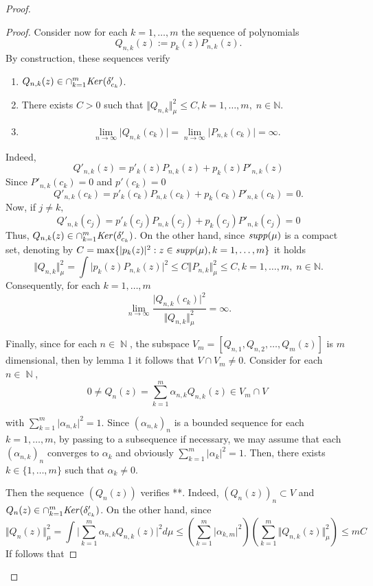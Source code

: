 \documentclass[12pt]{amsart}
\theoremstyle{definition}
\theoremstyle{plain}
\theoremstyle{remark}
\DeclareMathOperator{\NN}{\mathbb N}
\begin{document}
\begin{proof}
\begin{proof}
\noindent Consider now for each $k=1,\dots,m$ the sequence of polynomials $$Q_{n,k}(z):=p_k(z)P_{n,k}(z).$$
\noindent By construction, these sequences verify
\begin{enumerate}
    \item $Q_{n,k}(z) \in \cap_{k=1}^m {\it Ker}(\delta'_{c_k})$. 
\item There exists $C>0$ such that $
    \displaystyle{\Vert Q_{n,k}\Vert^2_{\mu}  \leq  C, k=1,\dots,m, \; n\in \mathbb{N}}.
    $
\item $$
\lim_{n\to \infty} \vert Q_{n,k}(c_k)\vert  =  \lim_{n\to \infty} \vert P_{n,k}(c_k)\vert  =\infty.
$$
\end{enumerate}

    \noindent Indeed, 
    $$
    Q'_{n,k}(z)= p'_k(z)P_{n,k}(z)+ p_k(z)P'_{n,k}(z)
    $$
   \noindent Since $P'_{n,k}(c_k)=0$ and $p'(c_k)=0$ 
   $$
    Q'_{n,k}(c_k)= p'_k(c_k)P_{n,k}(c_k)+ p_k(c_k)P'_{n,k}(c_k)=0.
    $$
    \noindent Now, if $j\neq k,$
    $$
    Q'_{n,k}(c_j)= p'_k(c_j)P_{n,k}(c_j)+ p_k(c_j)P'_{n,k}(c_j)=0
    $$
    \noindent Thus, $Q_{n,k}(z) \in \cap_{k=1}^m {\it Ker}(\delta'_{c_k})$. On the other hand, since ${\it supp}(\mu)
    $ is a compact set, denoting by $C=\max \{ \vert p_k(z) \vert^2 : z\in {\it supp}(\mu), k=1,\dots,m\}$ it holds 
$$
    \Vert Q_{n,k}\Vert^2_{\mu} = \int \vert p_k(z)P_{n,k}(z)\vert^2\leq C\Vert P_{n,k
    }\Vert_{\mu}^2 \leq C, k=1,\dots,m, \; n\in \mathbb{N}.
    $$
\noindent Consequently, for each $k=1,\dots,m$
$$
\lim_{n\to \infty} \dfrac{\vert Q_{n,k}(c_k) \vert^2}{ \Vert Q_{n,k}\Vert_{\mu}^2}=\infty.
$$


\medskip


\noindent Finally, since for each $n\in \NN$, the subspace $V_{m}=[Q_{n,1},Q_{n,2}, \dots,Q_m(z)]$ is $m$ dimensional, then by lemma 1 it follows that $V\cap V_m\neq 0$. Consider for each $n\in \NN$, 
$$
0 \neq Q_n(z)=\sum_{k=1}^m 
\alpha_{n,k} Q_{n,k}(z)
\in V_m \cap V \; 
$$

\noindent with  $\sum_{k=1}^m \vert \alpha_{n,k} \vert^2=1$. Since $(\alpha_{n,k})_n$ is a bounded sequence for each $k=1,\dots,m$, by passing to a subsequence if necessary, we may assume that each $(\alpha_{n,k})_n$ converges to $\alpha_k$ and obviously 
$\sum_{k=1}^m \vert \alpha_k \vert^2=1$. Then, there exists $k\in \{ 1,\dots,m\}$ such that $\alpha_k\neq 0.$

\noindent Then the sequence $(Q_n(z))$ verifies **. Indeed, $(Q_n(z))_n \subset V$ and  $Q_n(z) \in \cap_{k=1}^m  {\it Ker}(\delta'_{c_k})$. On the other hand, since 
$$
\Vert Q_n(z) \Vert_{\mu}^2 = \int \vert \sum_{k=1}^m 
\alpha_{n,k} Q_{n,k}(z) \vert^2 d\mu \leq \left( \sum_{k=1}^m \vert \alpha_{k,m}\vert^2\right)\left(\sum_{k=1}^m \Vert Q_{n,k}(z) \Vert^2_{\mu}\right) \leq mC
$$
\noindent If follows that 
    

\end{proof}
\end{proof}
\end{document}
